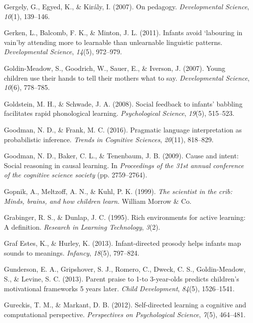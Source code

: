 \documentclass[english,floatsintext,man]{apa6}
\theoremstyle{definition}
\theoremstyle{definition}
\theoremstyle{definition}
\theoremstyle{remark}
\begin{document}
\hypertarget{ref-gergely2007pedagogy}{}
Gergely, G., Egyed, K., \& Király, I. (2007). On pedagogy.
\emph{Developmental Science}, \emph{10}(1), 139--146.

\hypertarget{ref-gerken2011infants}{}
Gerken, L., Balcomb, F. K., \& Minton, J. L. (2011). Infants avoid
`labouring in vain'by attending more to learnable than unlearnable
linguistic patterns. \emph{Developmental Science}, \emph{14}(5),
972--979.

\hypertarget{ref-goldin2007young}{}
Goldin-Meadow, S., Goodrich, W., Sauer, E., \& Iverson, J. (2007). Young
children use their hands to tell their mothers what to say.
\emph{Developmental Science}, \emph{10}(6), 778--785.

\hypertarget{ref-goldstein2008social}{}
Goldstein, M. H., \& Schwade, J. A. (2008). Social feedback to infants'
babbling facilitates rapid phonological learning. \emph{Psychological
Science}, \emph{19}(5), 515--523.

\hypertarget{ref-goodman2016pragmatic}{}
Goodman, N. D., \& Frank, M. C. (2016). Pragmatic language
interpretation as probabilistic inference. \emph{Trends in Cognitive
Sciences}, \emph{20}(11), 818--829.

\hypertarget{ref-goodman2009cause}{}
Goodman, N. D., Baker, C. L., \& Tenenbaum, J. B. (2009). Cause and
intent: Social reasoning in causal learning. In \emph{Proceedings of the
31st annual conference of the cognitive science society} (pp.
2759--2764).

\hypertarget{ref-gopnik1999scientist}{}
Gopnik, A., Meltzoff, A. N., \& Kuhl, P. K. (1999). \emph{The scientist
in the crib: Minds, brains, and how children learn.} William Morrow \&
Co.

\hypertarget{ref-grabinger1995rich}{}
Grabinger, R. S., \& Dunlap, J. C. (1995). Rich environments for active
learning: A definition. \emph{Research in Learning Technology},
\emph{3}(2).

\hypertarget{ref-graf2013infant}{}
Graf Estes, K., \& Hurley, K. (2013). Infant-directed prosody helps
infants map sounds to meanings. \emph{Infancy}, \emph{18}(5), 797--824.

\hypertarget{ref-gunderson2013parent}{}
Gunderson, E. A., Gripshover, S. J., Romero, C., Dweck, C. S.,
Goldin-Meadow, S., \& Levine, S. C. (2013). Parent praise to 1-to
3-year-olds predicts children's motivational frameworks 5 years later.
\emph{Child Development}, \emph{84}(5), 1526--1541.

\hypertarget{ref-gureckis2012self}{}
Gureckis, T. M., \& Markant, D. B. (2012). Self-directed learning a
cognitive and computational perspective. \emph{Perspectives on
Psychological Science}, \emph{7}(5), 464--481.
\end{document}
